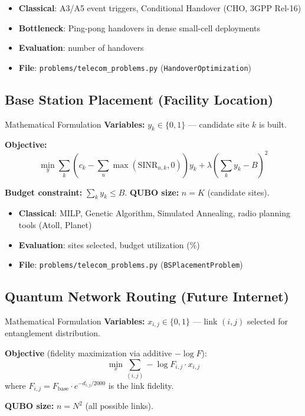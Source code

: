 \documentclass[11pt,a4paper]{article}
\begin{document}
\begin{itemize}
  \item \textbf{Classical}: A3/A5 event triggers, Conditional Handover (CHO, 3GPP Rel-16)
  \item \textbf{Bottleneck}: Ping-pong handovers in dense small-cell deployments
  \item \textbf{Evaluation}: number of handovers
  \item \textbf{File}: \texttt{problems/telecom\_problems.py} (\texttt{HandoverOptimization})
\end{itemize}

\subsection{Base Station Placement (Facility Location)}

\begin{mathbox}{Mathematical Formulation}
\textbf{Variables:} $y_k \in \{0,1\}$ — candidate site $k$ is built.

\textbf{Objective:}
$$\min_{y} \sum_k \left(c_k - \sum_u \max(\text{SINR}_{u,k}, 0)\right) y_k + \lambda \left(\sum_k y_k - B\right)^2$$

\textbf{Budget constraint:} $\sum_k y_k \leq B$. \quad \textbf{QUBO size:} $n = K$ (candidate sites).
\end{mathbox}

\begin{itemize}
  \item \textbf{Classical}: MILP, Genetic Algorithm, Simulated Annealing, radio planning tools (Atoll, Planet)
  \item \textbf{Evaluation}: sites selected, budget utilization (\%)
  \item \textbf{File}: \texttt{problems/telecom\_problems.py} (\texttt{BSPlacementProblem})
\end{itemize}

\subsection{Quantum Network Routing (Future Internet)}

\begin{mathbox}{Mathematical Formulation}
\textbf{Variables:} $x_{i,j} \in \{0,1\}$ — link $(i,j)$ selected for entanglement distribution.

\textbf{Objective} (fidelity maximization via additive $-\log F$):
$$\min_{x} \sum_{(i,j)} -\log F_{i,j} \cdot x_{i,j}$$
where $F_{i,j} = F_{\text{base}} \cdot e^{-d_{i,j}/2000}$ is the link fidelity.

\textbf{QUBO size:} $n = N^2$ (all possible links).
\end{mathbox}
\end{document}
